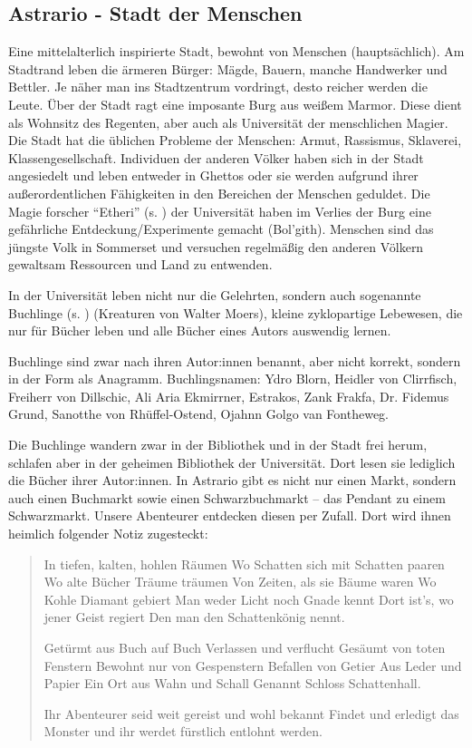 \documentclass[11pt, twoside]{article}
\begin{document}
\subsection{Astrario - Stadt der Menschen}
\label{sec:orgaa09020}
Eine mittelalterlich inspirierte Stadt, bewohnt von Menschen (hauptsächlich). Am Stadtrand leben die ärmeren Bürger: Mägde, Bauern, manche Handwerker und Bettler. Je näher man ins Stadtzentrum vordringt, desto reicher werden die Leute. Über der Stadt ragt eine imposante Burg aus weißem Marmor. Diese dient als Wohnsitz des Regenten, aber auch als Universität der menschlichen Magier. Die Stadt hat die üblichen Probleme der Menschen: Armut, Rassismus, Sklaverei, Klassengesellschaft. Individuen der anderen Völker haben sich in der Stadt angesiedelt und leben entweder in Ghettos oder sie werden aufgrund ihrer außerordentlichen Fähigkeiten in den Bereichen der Menschen geduldet. Die Magie forscher ``Etheri'' (s. \pageref{etheri}) der Universität haben im Verlies der Burg eine gefährliche Entdeckung/Experimente gemacht (Bol'gith). Menschen sind das jüngste Volk in Sommerset und versuchen regelmäßig den anderen Völkern gewaltsam Ressourcen und Land zu entwenden.

In der Universität leben nicht nur die Gelehrten, sondern auch sogenannte Buchlinge (s. \pageref{buchling}) (Kreaturen von Walter Moers), kleine zyklopartige Lebewesen, die nur für Bücher leben und alle Bücher eines Autors auswendig lernen.

Buchlinge sind zwar nach ihren Autor:innen benannt, aber nicht korrekt, sondern in der Form als Anagramm.
Buchlingsnamen: Ydro Blorn, Heidler von Clirrfisch, Freiherr von Dillschic, Ali Aria Ekmirrner, Estrakos, Zank Frakfa, Dr. Fidemus Grund, Sanotthe von Rhüffel-Ostend, Ojahnn Golgo van Fontheweg.

Die Buchlinge wandern zwar in der Bibliothek und in der Stadt frei herum, schlafen aber in der geheimen Bibliothek der Universität. Dort lesen sie lediglich die Bücher ihrer Autor:innen. In Astrario gibt es nicht nur einen Markt, sondern auch einen Buchmarkt sowie einen Schwarzbuchmarkt – das Pendant zu einem Schwarzmarkt. Unsere Abenteurer entdecken diesen per Zufall. Dort wird ihnen heimlich folgender Notiz zugesteckt:
\begin{quote}
In tiefen, kalten, hohlen Räumen
Wo Schatten sich mit Schatten paaren
Wo alte Bücher Träume träumen
Von Zeiten, als sie Bäume waren
Wo Kohle Diamant gebiert
Man weder Licht noch Gnade kennt
Dort ist’s, wo jener Geist regiert
Den man den Schattenkönig nennt.

Getürmt aus Buch auf Buch
Verlassen und verflucht
Gesäumt von toten Fenstern
Bewohnt nur von Gespenstern
Befallen von Getier
Aus Leder und Papier
Ein Ort aus Wahn und Schall
Genannt Schloss Schattenhall.

Ihr Abenteurer seid weit gereist und wohl bekannt Findet und erledigt das Monster und ihr werdet fürstlich entlohnt werden.
\end{quote}
\end{document}
